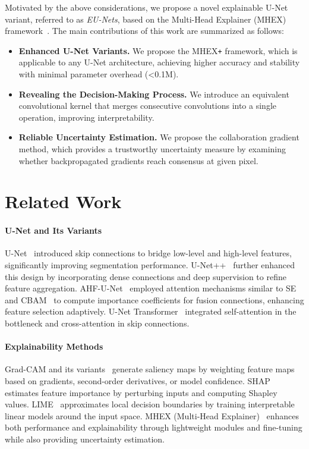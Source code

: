 \documentclass[runningheads]{llncs}
\begin{document}
Motivated by the above considerations, we propose a novel explainable U-Net variant, referred to as \emph{EU-Nets}, based on the Multi-Head Explainer (MHEX) framework~\cite{mhex}.  The main contributions of this work are summarized as follows:

\begin{itemize}
     \item \textbf{Enhanced U-Net Variants.} We propose the MHEX\texttt{+} framework, which is applicable to any U-Net architecture, achieving higher accuracy and stability with minimal parameter overhead (<0.1M).
    \item \textbf{Revealing the Decision-Making Process.} We introduce an equivalent convolutional kernel that merges consecutive convolutions into a single operation, improving interpretability.
    \item \textbf{Reliable Uncertainty Estimation.} We propose the collaboration gradient method, which provides a trustworthy uncertainty measure by examining whether backpropagated gradients reach consensus at given pixel.
\end{itemize}

\section{Related Work}

\paragraph{U-Net and Its Variants}  
U-Net~\cite{unet} introduced skip connections to bridge low-level and high-level features, significantly improving segmentation performance. U-Net++~\cite{unet++} further enhanced this design by incorporating dense connections and deep supervision to refine feature aggregation. AHF-U-Net~\cite{AHF-U-Net} employed attention mechanisms similar to SE~\cite{hu2018squeeze} and CBAM~\cite{woo2018cbam} to compute importance coefficients for fusion connections, enhancing feature selection adaptively. U-Net Transformer~\cite{U-NetTransformer} integrated self-attention in the bottleneck and cross-attention in skip connections.

\paragraph{Explainability Methods}  
Grad-CAM and its variants~\cite{wang2020score,chattopadhay2018grad,selvaraju2017grad} generate saliency maps by weighting feature maps based on gradients, second-order derivatives, or model confidence. SHAP~\cite{lundberg2017unified} estimates feature importance by perturbing inputs and computing Shapley values. LIME~\cite{ribeiro2016whyitrustyou} approximates local decision boundaries by training interpretable linear models around the input space. MHEX (Multi-Head Explainer)~\cite{mhex} enhances both performance and explainability through lightweight modules and fine-tuning while also providing uncertainty estimation.  
\end{document}
